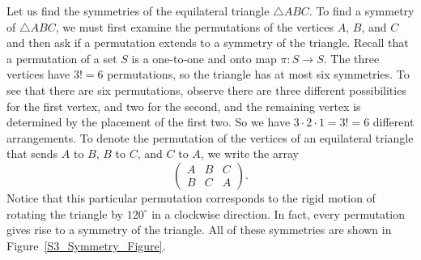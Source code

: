 \begin{figure}[hbt]
\begin{center}
\end{center}
\end{figure}


Let us find the symmetries of the equilateral triangle $\bigtriangleup ABC$.  To find a symmetry of $\bigtriangleup ABC$, we must first examine the permutations of the vertices $A$, $B$, and $C$ and then ask if a permutation extends to a symmetry of the triangle.  Recall that a {\bfi permutation\/} of a set $S$ is a one-to-one and onto map $\pi :S \rightarrow S$.  The three vertices have $3! = 6$ permutations, so the triangle has at most six symmetries.  To see that there are six permutations, observe there are three different possibilities for the first vertex, and two for the second, and the remaining vertex is determined by the placement of the first two.  So we have $3 \cdot 2 \cdot 1 = 3! = 6$ different arrangements.  To denote the permutation of the vertices of an equilateral triangle that sends $A$ to $B$, $B$ to $C$, and $C$ to $A$, we write the array
\[
\begin{pmatrix}
A & B & C \\
B & C & A
\end{pmatrix}.
\]
Notice that this particular permutation corresponds to the rigid motion of rotating the triangle by $120^{\circ}$ in a clockwise direction.  In fact, every permutation gives rise to a symmetry of the triangle.  All of these symmetries are shown in Figure~\ref{S3_Symmetry_Figure}.

